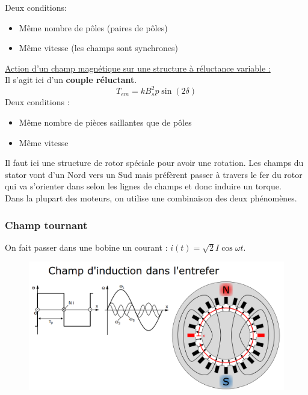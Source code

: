 \documentclass[../main.tex]{subfiles}
\begin{document}
Deux conditions:\begin{itemize}
    \item Même nombre de pôles (paires de pôles)\\
    \item Même vitesse (les champs sont synchrones)\\
\end{itemize}

\quad \underline{Action d'un champ magnétique sur une structure à réluctance variable :}\\
Il s'agit ici d'un \textbf{couple réluctant}.\\

\begin{equation}
    T_{em} = k B_s^2p \sin(2\delta)
\end{equation}
Deux conditions : \begin{itemize}
    \item Même nombre de pièces saillantes que de pôles\\
    \item Même vitesse\\
\end{itemize}

Il faut ici une structure de rotor spéciale pour avoir une rotation. Les champs du stator vont d'un Nord vers un Sud mais préfèrent passer à travers le fer du rotor qui va s'orienter dans selon les lignes de champs et donc induire un torque.\\

Dans la plupart des moteurs, on utilise une combinaison des deux phénomènes.\\

\subsubsection{Champ tournant}
On fait passer dans une bobine un courant : $i(t) = \sqrt{2}I \cos{\omega t}$.\\
\begin{figure}[hbt!]
    \centering
    \includegraphics[width=\textwidth]{IMAGES/machineelec/bobenf.png}
\end{figure}
\end{document}
